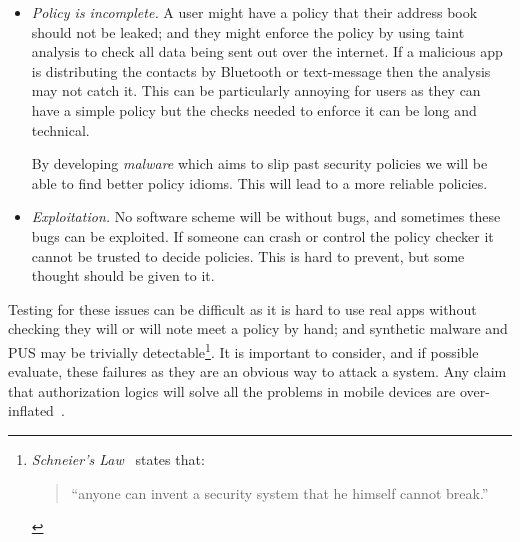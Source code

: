 \documentclass[a4paper,sfsidenotes]{%
  scrartcl%
}
\begin{document}
\begin{description}
\begin{itemize}
        This kind of failure leads to decisions being authorized incorrectly.
        How this affects the security of the device and knowing what must be
        done to recover from it is important for policies to be resiliant.  A
        variation of this might be service which stops decisions being
        authorized.  For example, suppose a video streaming service bribed an
        antivirus service to say all its competitors were malicious.  Knowing
        how to recover from this (especially after a user may have installed the
        video streamer out of frustration) is not obvious\footnote{Though
          perhaps a similar solution to Microsoft's Internet Explorer being
          compelled to advertise alternatives might work well.}.

      \item \emph{Policy is incomplete.}  A user might have a policy that their
        address book should not be leaked; and they might enforce the policy by
        using taint analysis to check all data being sent out over the internet.
        If a malicious app is distributing the contacts by Bluetooth or
        text-message then the analysis may not catch it.  This can be
        particularly annoying for users as they can have a simple policy but the
        checks needed to enforce it can be long and technical.

        By developing \emph{malware} which aims to slip past security
        policies we will be able to find better policy idioms.  This will lead
        to a more reliable policies.

      \item \emph{Exploitation.}  No software scheme will be without bugs, and
        sometimes these bugs can be exploited.  If someone can crash or control
        the policy checker it cannot be trusted to decide policies.
        This is hard to prevent, but some thought should be given to it.
    
    \end{itemize}
  
    Testing for these issues can be difficult as it is hard to use real apps
    without checking they will or will note meet a policy by hand; and synthetic
    malware and \ac{PUS} may be trivially detectable\footnote{\emph{Schneier's
    Law}~\cite{Schneier:ws} states that: \begin{quote}``anyone can invent a security
      system that he himself cannot break.''\end{quote}}.  It is important to
    consider, and if possible evaluate, these failures as they are an obvious
    way to attack a system.  Any claim that authorization logics will solve all
    the problems in mobile devices are over-inflated~\cite{Kruger:1999dd}.

\end{description}
\end{document}
